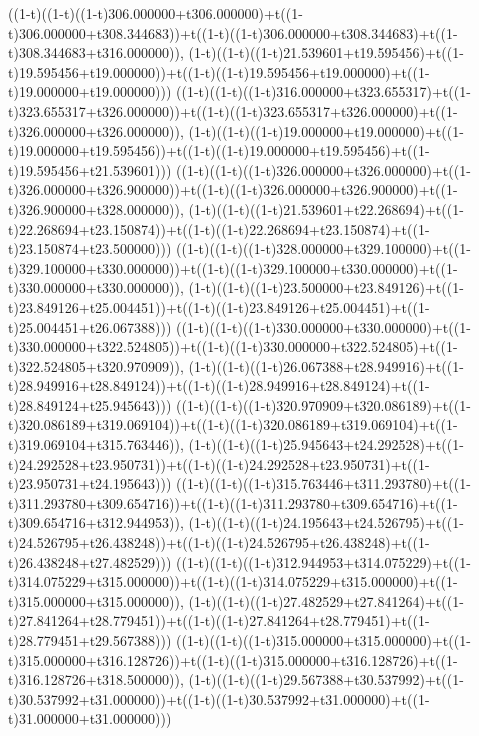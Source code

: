 ((1-t)((1-t)((1-t)306.000000+t306.000000)+t((1-t)306.000000+t308.344683))+t((1-t)((1-t)306.000000+t308.344683)+t((1-t)308.344683+t316.000000)),                                     (1-t)((1-t)((1-t)21.539601+t19.595456)+t((1-t)19.595456+t19.000000))+t((1-t)((1-t)19.595456+t19.000000)+t((1-t)19.000000+t19.000000)))
((1-t)((1-t)((1-t)316.000000+t323.655317)+t((1-t)323.655317+t326.000000))+t((1-t)((1-t)323.655317+t326.000000)+t((1-t)326.000000+t326.000000)),                                     (1-t)((1-t)((1-t)19.000000+t19.000000)+t((1-t)19.000000+t19.595456))+t((1-t)((1-t)19.000000+t19.595456)+t((1-t)19.595456+t21.539601)))
((1-t)((1-t)((1-t)326.000000+t326.000000)+t((1-t)326.000000+t326.900000))+t((1-t)((1-t)326.000000+t326.900000)+t((1-t)326.900000+t328.000000)),                                     (1-t)((1-t)((1-t)21.539601+t22.268694)+t((1-t)22.268694+t23.150874))+t((1-t)((1-t)22.268694+t23.150874)+t((1-t)23.150874+t23.500000)))
((1-t)((1-t)((1-t)328.000000+t329.100000)+t((1-t)329.100000+t330.000000))+t((1-t)((1-t)329.100000+t330.000000)+t((1-t)330.000000+t330.000000)),                                     (1-t)((1-t)((1-t)23.500000+t23.849126)+t((1-t)23.849126+t25.004451))+t((1-t)((1-t)23.849126+t25.004451)+t((1-t)25.004451+t26.067388)))
((1-t)((1-t)((1-t)330.000000+t330.000000)+t((1-t)330.000000+t322.524805))+t((1-t)((1-t)330.000000+t322.524805)+t((1-t)322.524805+t320.970909)),                                     (1-t)((1-t)((1-t)26.067388+t28.949916)+t((1-t)28.949916+t28.849124))+t((1-t)((1-t)28.949916+t28.849124)+t((1-t)28.849124+t25.945643)))
((1-t)((1-t)((1-t)320.970909+t320.086189)+t((1-t)320.086189+t319.069104))+t((1-t)((1-t)320.086189+t319.069104)+t((1-t)319.069104+t315.763446)),                                     (1-t)((1-t)((1-t)25.945643+t24.292528)+t((1-t)24.292528+t23.950731))+t((1-t)((1-t)24.292528+t23.950731)+t((1-t)23.950731+t24.195643)))
((1-t)((1-t)((1-t)315.763446+t311.293780)+t((1-t)311.293780+t309.654716))+t((1-t)((1-t)311.293780+t309.654716)+t((1-t)309.654716+t312.944953)),                                     (1-t)((1-t)((1-t)24.195643+t24.526795)+t((1-t)24.526795+t26.438248))+t((1-t)((1-t)24.526795+t26.438248)+t((1-t)26.438248+t27.482529)))
((1-t)((1-t)((1-t)312.944953+t314.075229)+t((1-t)314.075229+t315.000000))+t((1-t)((1-t)314.075229+t315.000000)+t((1-t)315.000000+t315.000000)),                                     (1-t)((1-t)((1-t)27.482529+t27.841264)+t((1-t)27.841264+t28.779451))+t((1-t)((1-t)27.841264+t28.779451)+t((1-t)28.779451+t29.567388)))
((1-t)((1-t)((1-t)315.000000+t315.000000)+t((1-t)315.000000+t316.128726))+t((1-t)((1-t)315.000000+t316.128726)+t((1-t)316.128726+t318.500000)),                                     (1-t)((1-t)((1-t)29.567388+t30.537992)+t((1-t)30.537992+t31.000000))+t((1-t)((1-t)30.537992+t31.000000)+t((1-t)31.000000+t31.000000)))
